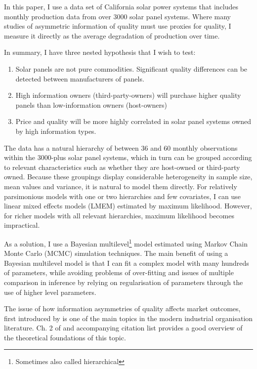 \documentclass[12pt]{article}
\begin{document}
In this paper, I use a data set of California solar power systems that includes monthly production data from over 3000 solar panel systems. Where many studies of asymmetric information of quality must use proxies for quality, I measure it directly as the average degradation of production over time.

In summary, I have three nested hypothesis that I wish to test:

\begin{enumerate}
  \item Solar panels are not pure commodities. Significant quality differences can be detected between manufacturers of panels.
  \item High information owners (third-party-owners) will purchase higher quality panels than low-information owners (host-owners)
  \item Price and quality will be more highly correlated in solar panel systems owned by high information types.
\end{enumerate}

The data has a natural hierarchy of between 36 and 60 monthly observations within the 3000-plus solar panel systems, which in turn can be grouped according to relevant characteristics such as whether they are host-owned or third-party owned. Because these groupings display considerable heterogeneity in sample size, mean values and variance, it is natural to model them directly. For relatively parsimonious models with one or two hierarchies and few covariates, I can use linear mixed effects models (LMEM) estimated by maximum likelihood. However, for richer models  with all relevant hierarchies, maximum likelihood becomes impractical.


As a solution, I use a Bayesian multilevel\footnote{Sometimes also called hierarchical} model estimated using Markov Chain Monte Carlo (MCMC) simulation techniques. The main benefit of using a Bayesian multilevel model is that I can fit a complex model with many hundreds of parameters, while avoiding problems of over-fitting and issues of multiple comparison in inference by relying on regularisation of parameters through the use of higher level parameters.

The issue of how information asymmetries of quality affects market outcomes, first introduced by \citet{akerlof_market_1970} is one of the main topics in the modern industrial organisation literature. Ch. 2 of \citet{tirole_theory_1988} and accompanying citation list provides a good overview of the theoretical foundations of this topic.
\end{document}
